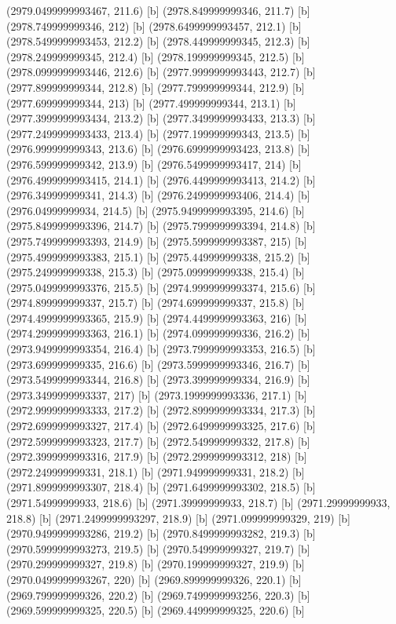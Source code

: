 {{{(2979.0499999993467, 211.6) [b] 
(2978.849999999346, 211.7) [b] 
(2978.749999999346, 212) [b] 
(2978.6499999993457, 212.1) [b] 
(2978.5499999993453, 212.2) [b] 
(2978.449999999345, 212.3) [b] 
(2978.249999999345, 212.4) [b] 
(2978.199999999345, 212.5) [b] 
(2978.0999999993446, 212.6) [b] 
(2977.9999999993443, 212.7) [b] 
(2977.899999999344, 212.8) [b] 
(2977.799999999344, 212.9) [b] 
(2977.699999999344, 213) [b] 
(2977.499999999344, 213.1) [b] 
(2977.3999999993434, 213.2) [b] 
(2977.3499999993433, 213.3) [b] 
(2977.2499999993433, 213.4) [b] 
(2977.199999999343, 213.5) [b] 
(2976.999999999343, 213.6) [b] 
(2976.6999999993423, 213.8) [b] 
(2976.599999999342, 213.9) [b] 
(2976.5499999993417, 214) [b] 
(2976.4999999993415, 214.1) [b] 
(2976.4499999993413, 214.2) [b] 
(2976.349999999341, 214.3) [b] 
(2976.2499999993406, 214.4) [b] 
(2976.04999999934, 214.5) [b] 
(2975.9499999993395, 214.6) [b] 
(2975.8499999993396, 214.7) [b] 
(2975.7999999993394, 214.8) [b] 
(2975.7499999993393, 214.9) [b] 
(2975.5999999993387, 215) [b] 
(2975.4999999993383, 215.1) [b] 
(2975.449999999338, 215.2) [b] 
(2975.249999999338, 215.3) [b] 
(2975.099999999338, 215.4) [b] 
(2975.0499999993376, 215.5) [b] 
(2974.9999999993374, 215.6) [b] 
(2974.899999999337, 215.7) [b] 
(2974.699999999337, 215.8) [b] 
(2974.4999999993365, 215.9) [b] 
(2974.4499999993363, 216) [b] 
(2974.2999999993363, 216.1) [b] 
(2974.099999999336, 216.2) [b] 
(2973.9499999993354, 216.4) [b] 
(2973.7999999993353, 216.5) [b] 
(2973.699999999335, 216.6) [b] 
(2973.5999999993346, 216.7) [b] 
(2973.5499999993344, 216.8) [b] 
(2973.399999999334, 216.9) [b] 
(2973.3499999993337, 217) [b] 
(2973.1999999993336, 217.1) [b] 
(2972.9999999993333, 217.2) [b] 
(2972.8999999993334, 217.3) [b] 
(2972.6999999993327, 217.4) [b] 
(2972.6499999993325, 217.6) [b] 
(2972.5999999993323, 217.7) [b] 
(2972.549999999332, 217.8) [b] 
(2972.3999999993316, 217.9) [b] 
(2972.2999999993312, 218) [b] 
(2972.249999999331, 218.1) [b] 
(2971.949999999331, 218.2) [b] 
(2971.8999999993307, 218.4) [b] 
(2971.6499999993302, 218.5) [b] 
(2971.54999999933, 218.6) [b] 
(2971.39999999933, 218.7) [b] 
(2971.29999999933, 218.8) [b] 
(2971.2499999993297, 218.9) [b] 
(2971.099999999329, 219) [b] 
(2970.9499999993286, 219.2) [b] 
(2970.8499999993282, 219.3) [b] 
(2970.5999999993273, 219.5) [b] 
(2970.549999999327, 219.7) [b] 
(2970.299999999327, 219.8) [b] 
(2970.199999999327, 219.9) [b] 
(2970.0499999993267, 220) [b] 
(2969.899999999326, 220.1) [b] 
(2969.799999999326, 220.2) [b] 
(2969.7499999993256, 220.3) [b] 
(2969.599999999325, 220.5) [b] 
(2969.449999999325, 220.6) [b] 
}}}
